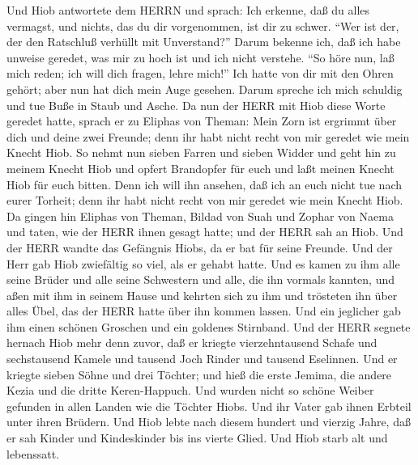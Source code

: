  Und Hiob antwortete dem HERRN und sprach:  Ich
erkenne, daß du alles vermagst, und nichts, das du dir vorgenommen, ist
dir zu schwer.  ``Wer ist der, der den Ratschluß verhüllt
mit Unverstand?'' Darum bekenne ich, daß ich habe unweise geredet, was
mir zu hoch ist und ich nicht verstehe.  ``So höre nun, laß
mich reden; ich will dich fragen, lehre mich!''  Ich hatte
von dir mit den Ohren gehört; aber nun hat dich mein Auge gesehen.
 Darum spreche ich mich schuldig und tue Buße in Staub und
Asche.  Da nun der HERR mit Hiob diese Worte geredet hatte,
sprach er zu Eliphas von Theman: Mein Zorn ist ergrimmt über dich und
deine zwei Freunde; denn ihr habt nicht recht von mir geredet wie mein
Knecht Hiob.  So nehmt nun sieben Farren und sieben Widder
und geht hin zu meinem Knecht Hiob und opfert Brandopfer für euch und
laßt meinen Knecht Hiob für euch bitten. Denn ich will ihn ansehen, daß
ich an euch nicht tue nach eurer Torheit; denn ihr habt nicht recht von
mir geredet wie mein Knecht Hiob.  Da gingen hin Eliphas von
Theman, Bildad von Suah und Zophar von Naema und taten, wie der HERR
ihnen gesagt hatte; und der HERR sah an Hiob.  Und der HERR
wandte das Gefängnis Hiobs, da er bat für seine Freunde. Und der Herr
gab Hiob zwiefältig so viel, als er gehabt hatte.  Und es
kamen zu ihm alle seine Brüder und alle seine Schwestern und alle, die
ihn vormals kannten, und aßen mit ihm in seinem Hause und kehrten sich
zu ihm und trösteten ihn über alles Übel, das der HERR hatte über ihn
kommen lassen. Und ein jeglicher gab ihm einen schönen Groschen und ein
goldenes Stirnband.  Und der HERR segnete hernach Hiob mehr
denn zuvor, daß er kriegte vierzehntausend Schafe und sechstausend
Kamele und tausend Joch Rinder und tausend Eselinnen.  Und
er kriegte sieben Söhne und drei Töchter;  und hieß die
erste Jemima, die andere Kezia und die dritte Keren-Happuch.
 Und wurden nicht so schöne Weiber gefunden in allen Landen
wie die Töchter Hiobs. Und ihr Vater gab ihnen Erbteil unter ihren
Brüdern.  Und Hiob lebte nach diesem hundert und vierzig
Jahre, daß er sah Kinder und Kindeskinder bis ins vierte Glied.
 Und Hiob starb alt und lebenssatt.
